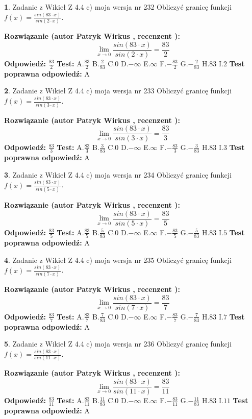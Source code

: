 \documentclass[12pt, a4paper]{article}
\theoremstyle{definition} %
\newtheorem{zad}{}
\newcommand{\zadStart}[1]{\begin{zad}#1\newline}
\newcommand{\zadStop}{\end{zad}}
\newcommand{\rozwStart}[2]{\noindent \textbf{Rozwiązanie (autor #1 , recenzent #2): }\newline}
\newcommand{\rozwStop}{\newline}
\newcommand{\odpStart}{\noindent \textbf{Odpowiedź:}\newline}
\newcommand{\odpStop}{\newline}
\newcommand{\testStart}{\noindent \textbf{Test:}\newline}
\newcommand{\testStop}{\newline}
\newcommand{\kluczStart}{\noindent \textbf{Test poprawna odpowiedź:}\newline}
\newcommand{\kluczStop}{\newline}
\begin{document}
\zadStart{Zadanie z Wikieł Z 4.4 c) moja wersja nr 232}
Obliczyć granicę funkcji $f(x)=\frac{sin(83\cdot x)}{sin(2\cdot x)}$.
\zadStop
\rozwStart{Patryk Wirkus}{}
$$\lim\limits_{x\to 0}\frac{sin(83\cdot x)}{sin(2\cdot x)}=
\frac{83}{2}$$
\rozwStop
\odpStart
$\frac{83}{2}$
\odpStop
\testStart
A.$\frac{83}{2}$
B.$\frac{2}{83}$
C.$0$
D.$-\infty$
E.$\infty$
F.$-\frac{83}{2}$
G.$-\frac{2}{83}$
H.$83$
I.$2$
\testStop
\kluczStart
A
\kluczStop



\zadStart{Zadanie z Wikieł Z 4.4 c) moja wersja nr 233}
Obliczyć granicę funkcji $f(x)=\frac{sin(83\cdot x)}{sin(3\cdot x)}$.
\zadStop
\rozwStart{Patryk Wirkus}{}
$$\lim\limits_{x\to 0}\frac{sin(83\cdot x)}{sin(3\cdot x)}=
\frac{83}{3}$$
\rozwStop
\odpStart
$\frac{83}{3}$
\odpStop
\testStart
A.$\frac{83}{3}$
B.$\frac{3}{83}$
C.$0$
D.$-\infty$
E.$\infty$
F.$-\frac{83}{3}$
G.$-\frac{3}{83}$
H.$83$
I.$3$
\testStop
\kluczStart
A
\kluczStop



\zadStart{Zadanie z Wikieł Z 4.4 c) moja wersja nr 234}
Obliczyć granicę funkcji $f(x)=\frac{sin(83\cdot x)}{sin(5\cdot x)}$.
\zadStop
\rozwStart{Patryk Wirkus}{}
$$\lim\limits_{x\to 0}\frac{sin(83\cdot x)}{sin(5\cdot x)}=
\frac{83}{5}$$
\rozwStop
\odpStart
$\frac{83}{5}$
\odpStop
\testStart
A.$\frac{83}{5}$
B.$\frac{5}{83}$
C.$0$
D.$-\infty$
E.$\infty$
F.$-\frac{83}{5}$
G.$-\frac{5}{83}$
H.$83$
I.$5$
\testStop
\kluczStart
A
\kluczStop



\zadStart{Zadanie z Wikieł Z 4.4 c) moja wersja nr 235}
Obliczyć granicę funkcji $f(x)=\frac{sin(83\cdot x)}{sin(7\cdot x)}$.
\zadStop
\rozwStart{Patryk Wirkus}{}
$$\lim\limits_{x\to 0}\frac{sin(83\cdot x)}{sin(7\cdot x)}=
\frac{83}{7}$$
\rozwStop
\odpStart
$\frac{83}{7}$
\odpStop
\testStart
A.$\frac{83}{7}$
B.$\frac{7}{83}$
C.$0$
D.$-\infty$
E.$\infty$
F.$-\frac{83}{7}$
G.$-\frac{7}{83}$
H.$83$
I.$7$
\testStop
\kluczStart
A
\kluczStop



\zadStart{Zadanie z Wikieł Z 4.4 c) moja wersja nr 236}
Obliczyć granicę funkcji $f(x)=\frac{sin(83\cdot x)}{sin(11\cdot x)}$.
\zadStop
\rozwStart{Patryk Wirkus}{}
$$\lim\limits_{x\to 0}\frac{sin(83\cdot x)}{sin(11\cdot x)}=
\frac{83}{11}$$
\rozwStop
\odpStart
$\frac{83}{11}$
\odpStop
\testStart
A.$\frac{83}{11}$
B.$\frac{11}{83}$
C.$0$
D.$-\infty$
E.$\infty$
F.$-\frac{83}{11}$
G.$-\frac{11}{83}$
H.$83$
I.$11$
\testStop
\kluczStart
A
\kluczStop
\end{document}
